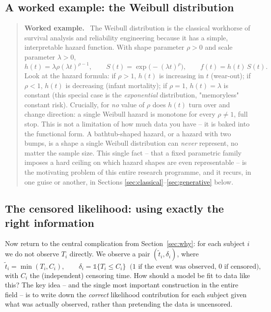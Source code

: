 \documentclass[11pt]{article}
\newenvironment{worked}
  {\par\addvspace{8pt}\begin{quote}\noindent\textbf{\textcolor{black!50!white}{Worked example.}}\ }
  {\end{quote}\par\addvspace{8pt}}
\begin{document}
\subsection{A worked example: the Weibull distribution}

\begin{worked}
The Weibull distribution is the classical workhorse of survival analysis
and reliability engineering because it has a simple, interpretable hazard
function. With shape parameter $\rho > 0$ and scale parameter $\lambda >
0$,
\[
  h(t) = \lambda \rho (\lambda t)^{\rho - 1}, \qquad
  S(t) = \exp\bigl(-(\lambda t)^\rho\bigr), \qquad
  f(t) = h(t)\,S(t).
\]
Look at the hazard formula: if $\rho > 1$, $h(t)$ is increasing in $t$
(wear-out); if $\rho < 1$, $h(t)$ is decreasing (infant mortality); if
$\rho = 1$, $h(t) = \lambda$ is constant (this special case is the
\emph{exponential} distribution, "memoryless" constant risk). Crucially,
for \emph{no} value of $\rho$ does $h(t)$ turn over and change direction:
a single Weibull hazard is monotone for every $\rho \ne 1$, full stop.
This is not a limitation of how much data you have -- it is baked into
the functional form. A bathtub-shaped hazard, or a hazard with two
bumps, is a shape a single Weibull distribution can \emph{never}
represent, no matter the sample size. This single fact -- that a fixed
parametric family imposes a hard ceiling on which hazard shapes are even
representable -- is the motivating problem of this entire research
programme, and it recurs, in one guise or another, in Sections
\ref{sec:classical}--\ref{sec:generative} below.
\end{worked}

\subsection{The censored likelihood: using exactly the right information}
\label{sec:censored-likelihood}

Now return to the central complication from Section~\ref{sec:why}: for
each subject $i$ we do not observe $T_i$ directly. We observe a pair
$(\tilde t_i, \delta_i)$, where
\[
  \tilde t_i = \min(T_i, C_i), \qquad
  \delta_i = \mathbb{1}\{T_i \le C_i\} \;\; \text{(1 if the event was observed, 0 if censored)},
\]
with $C_i$ the (independent) censoring time. How should a model be fit to
data like this? The key idea -- and the single most important
construction in the entire field -- is to write down the \emph{correct}
likelihood contribution for each subject given what was actually
observed, rather than pretending the data is uncensored.
\end{document}

